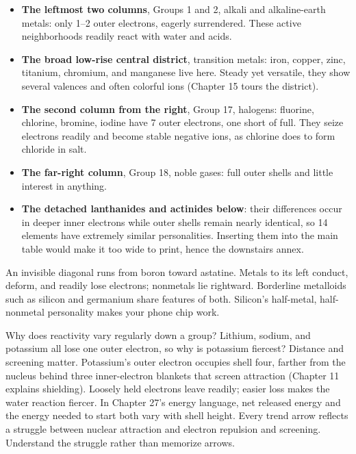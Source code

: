 \begin{itemize}[itemsep=2pt]
\item \textbf{The leftmost two columns}, Groups 1 and 2, alkali and alkaline-earth metals: only 1--2 outer electrons, eagerly surrendered. These active neighborhoods readily react with water and acids.
\item \textbf{The broad low-rise central district}, transition metals: iron, copper, zinc, titanium, chromium, and manganese live here. Steady yet versatile, they show several valences and often colorful ions (Chapter 15 tours the district).
\item \textbf{The second column from the right}, Group 17, halogens: fluorine, chlorine, bromine, iodine have 7 outer electrons, one short of full. They seize electrons readily and become stable negative ions, as chlorine does to form chloride in salt.
\item \textbf{The far-right column}, Group 18, noble gases: full outer shells and little interest in anything.
\item \textbf{The detached lanthanides and actinides below}: their differences occur in deeper inner electrons while outer shells remain nearly identical, so 14 elements have extremely similar personalities. Inserting them into the main table would make it too wide to print, hence the downstairs annex.
\end{itemize}

An invisible diagonal runs from boron toward astatine. Metals to its left conduct, deform, and readily lose electrons; nonmetals lie rightward. Borderline metalloids such as silicon and germanium share features of both. Silicon's half-metal, half-nonmetal personality makes your phone chip work.

\begin{qiaoliang}
Why does reactivity vary regularly down a group? Lithium, sodium, and potassium all lose one outer electron, so why is potassium fiercest? Distance and screening matter. Potassium's outer electron occupies shell four, farther from the nucleus behind three inner-electron blankets that screen attraction (Chapter 11 explains shielding). Loosely held electrons leave readily; easier loss makes the water reaction fiercer. In Chapter 27's energy language, net released energy and the energy needed to start both vary with shell height. Every trend arrow reflects a struggle between nuclear attraction and electron repulsion and screening. Understand the struggle rather than memorize arrows.
\end{qiaoliang}

